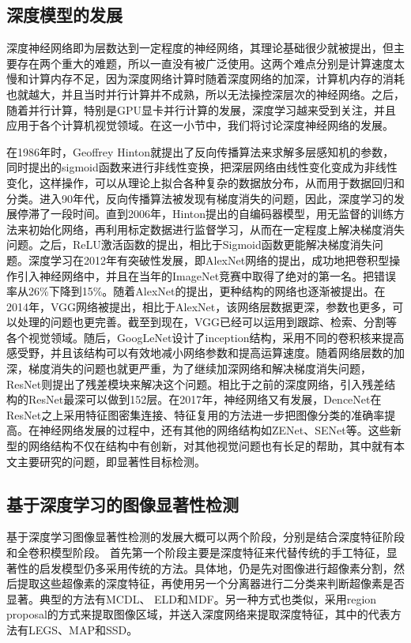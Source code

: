 \subsection{深度模型的发展}
深度神经网络即为层数达到一定程度的神经网络，其理论基础很少就被提出，但主要存在两个重大的难题，所以一直没有被广泛使用。这两个难点分别是计算速度太慢和计算内存不足，因为深度网络计算时随着深度网络的加深，计算机内存的消耗也就越大，并且当时并行计算并不成熟，所以无法操控深层次的神经网络。之后，随着并行计算，特别是GPU显卡并行计算的发展，深度学习越来受到关注，并且应用于各个计算机视觉领域。在这一小节中，我们将讨论深度神经网络的发展。

在1986年时，Geoffrey Hinton就提出了反向传播算法\cite{rumelhart1988learning}来求解多层感知机的参数，同时提出的sigmoid函数来进行非线性变换，把深层网络由线性变化变成为非线性变化，这样操作，可以从理论上拟合各种复杂的数据放分布，从而用于数据回归和分类。进入90年代，反向传播算法被发现有梯度消失的问题，因此，深度学习的发展停滞了一段时间。直到2006年，Hinton提出的自编码器模型\cite{hinton2006reducing}，用无监督的训练方法来初始化网络，再利用标定数据进行监督学习，从而在一定程度上解决梯度消失问题。之后，ReLU激活函数的提出，相比于Sigmoid函数更能解决梯度消失问题。深度学习在2012年有突破性发展，即AlexNet网络\cite{krizhevsky2012imagenet}的提出，成功地把卷积型操作引入神经网络中，并且在当年的ImageNet竞赛中取得了绝对的第一名。把错误率从26\%下降到15\%。随着AlexNet的提出，更种结构的网络也逐渐被提出。在2014年，VGG网络\cite{simonyan2014very}被提出，相比于AlexNet，该网络层数据更深，参数也更多，可以处理的问题也更完善。截至到现在，VGG已经可以运用到跟踪、检索、分割等各个视觉领域。随后，GoogLeNet\cite{szegedy2015going}设计了inception结构，采用不同的卷积核来提高感受野，并且该结构可以有效地减小网络参数和提高运算速度。随着网络层数的加深，梯度消失的问题也就更严重，为了继续加深网络和解决梯度消失问题，ResNet\cite{7780459}则提出了残差模块来解决这个问题。相比于之前的深度网络，引入残差结构的ResNet最深可以做到152层。在2017年，神经网络又有发展，DenceNet\cite{8099726}在ResNet之上采用特征图密集连接、特征复用的方法进一步把图像分类的准确率提高。在神经网络发展的过程中，还有其他的网络结构如ZENet、SENet等。这些新型的网络结构不仅在结构中有创新，对其他视觉问题也有长足的帮助，其中就有本文主要研究的问题，即显著性目标检测。

\subsection{基于深度学习的图像显著性检测}
基于深度学习图像显著性检测的发展大概可以两个阶段，分别是结合深度特征阶段和全卷积模型阶段。
首先第一个阶段主要是深度特征来代替传统的手工特征，显著性的启发模型仍多采用传统的方法。具体地，仍是先对图像进行超像素分割，然后提取这些超像素的深度特征，再使用另一个分离器进行二分类来判断超像素是否显著。典型的方法有MCDL\cite{zhao2015saliency}、 ELD\cite{7780447}和MDF\cite{li2016visual}。另一种方式也类似，采用region proposal的方式来提取图像区域，并送入深度网络来提取深度特征，其中的代表方法有LEGS\cite{wang2015deep}、MAP\cite{7780987}和SSD\cite{10.1007/978-3-319-46493-0_28}。

